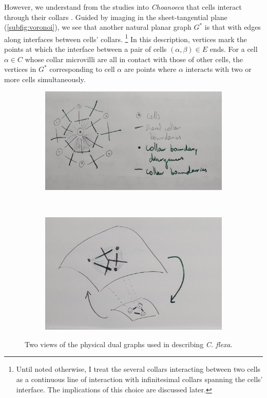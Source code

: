 However, we understand from the studies into \textit{Choanoeca} that cells interact through their collars \citep{ellis1930,leadbeater1983,brunet2019}. 
Guided by imaging in the sheet-tangential plane (\cref{subfig:voronoi}), we see that another natural planar graph $G^*$ is that with edges along interfaces between cells' collars. 
\footnote{Until noted otherwise, I treat the several collars interacting between two cells as a continuous line of interaction with infinitesimal collars spanning the cells' interface. The implications of this choice are discussed later.} 
In this description, vertices mark the points at which the interface between a pair of cells $(\alpha, \beta)\in E$ ends. 
For a cell $\alpha\in C$ whose collar microvilli are all in contact with those of other cells, the vertices in $G^*$ corresponding to cell $\alpha$ are points where $\alpha$ interacts with two or more cells simultaneously.

\begin{figure}[htbp]
    \centering
    \begin{subfigure}[b]{0.52\textwidth}
        \includegraphics[width=\textwidth]{duals1.jpg}
        \caption{}
        \label{subfig:duals1}
    \end{subfigure}
    ~
    \begin{subfigure}[b]{0.46\textwidth}
        \includegraphics[width=\textwidth]{duals2.jpg}
        \caption{}
        \label{subfig:duals2}
    \end{subfigure}
    \caption{Two views of the physical dual graphs used in describing \textit{C. flexa}.}
    \label{fig:duals}
\end{figure}

